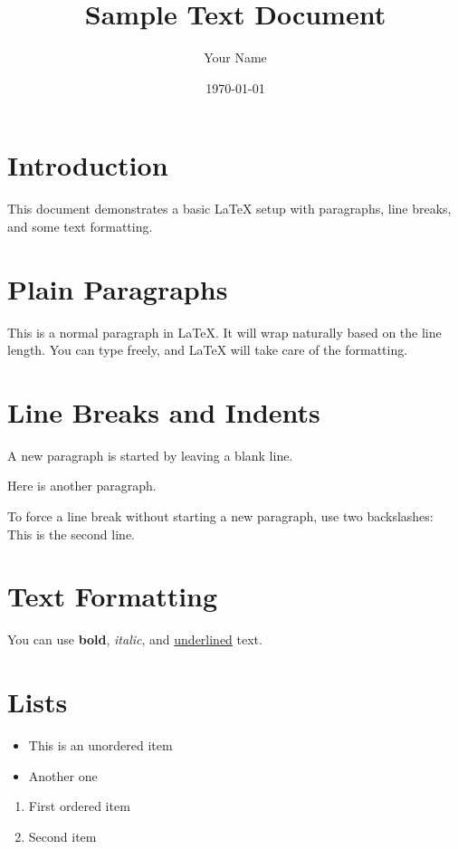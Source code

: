 \documentclass{article}
\title{Sample Text Document}
\author{Your Name}
\date{\today}
\begin{document}
\maketitle

\section{Introduction}
This document demonstrates a basic LaTeX setup with paragraphs, line breaks, and some text formatting.

\section{Plain Paragraphs}
This is a normal paragraph in LaTeX. It will wrap naturally based on the line length. You can type freely, and LaTeX will take care of the formatting.

\section{Line Breaks and Indents}
A new paragraph is started by leaving a blank line.

Here is another paragraph.

To force a line break without starting a new paragraph, use two backslashes:\\
This is the second line.

\section{Text Formatting}
You can use \textbf{bold}, \textit{italic}, and \underline{underlined} text.

\section{Lists}
\begin{itemize}
  \item This is an unordered item
  \item Another one
\end{itemize}

\begin{enumerate}
  \item First ordered item
  \item Second item
\end{enumerate}
\end{document}
